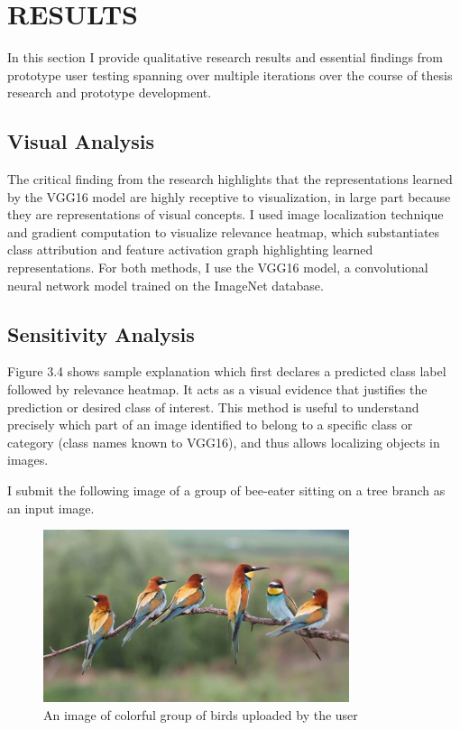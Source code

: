 \chapter{RESULTS}

\graphicspath{ {./results/} }
\thispagestyle{empty}


In this section I provide qualitative research results and essential findings from prototype user testing spanning over multiple iterations over the course of thesis research and prototype development. 

\section{Visual Analysis}

The critical finding from the research highlights that the representations learned by the VGG16 model are highly receptive to visualization, in large part because they are representations of visual concepts. I used image localization technique and gradient computation to visualize relevance heatmap, which substantiates class attribution and feature activation graph highlighting learned representations. For both methods, I use the VGG16 model, a convolutional neural network model trained on the ImageNet database.

\section*{Sensitivity Analysis}

Figure 3.4 shows sample explanation which first declares a predicted class label followed by relevance heatmap. It acts as a visual evidence that justifies the prediction or desired class of interest. This method is useful to understand precisely which part of an image identified to belong to a specific class or category (class names known to VGG16), and thus allows localizing objects in images.

I submit the following image of a group of bee-eater sitting on a tree branch as an input image.

\begin{figure}[htbp]
\centering
\includegraphics[width=0.80\textwidth]{images/colorful-group-of-birds-get-together_vkmuak6_e__F0000.png}
\caption{An image of colorful group of birds uploaded by the user}
\label{fig:myFig}
\end{figure}

